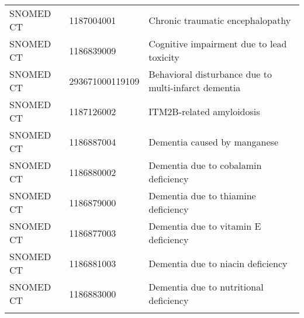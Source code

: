 \begin{longtable}{p{}p{}p{}}
  SNOMED CT & 1187004001 & Chronic traumatic encephalopathy \\ 
  SNOMED CT & 1186839009 & Cognitive impairment due to lead toxicity \\ 
  SNOMED CT & 293671000119109 & Behavioral disturbance due to multi-infarct dementia \\ 
  SNOMED CT & 1187126002 & ITM2B-related amyloidosis \\ 
  SNOMED CT & 1186887004 & Dementia caused by manganese \\ 
  SNOMED CT & 1186880002 & Dementia due to cobalamin deficiency \\ 
  SNOMED CT & 1186879000 & Dementia due to thiamine deficiency \\ 
  SNOMED CT & 1186877003 & Dementia due to vitamin E deficiency \\ 
  SNOMED CT & 1186881003 & Dementia due to niacin deficiency \\ 
  SNOMED CT & 1186883000 & Dementia due to nutritional deficiency \\ 
  \hline
\label{tab:codes_cognitive_impairment}
\end{longtable}
